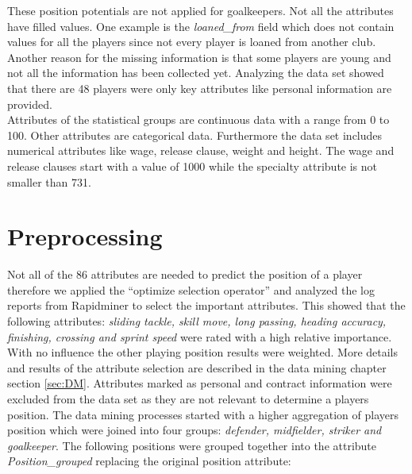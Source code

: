 \documentclass[runningheads]{llncs}
\begin{document}
These position potentials are not applied for goalkeepers. 
Not all the attributes have filled values. One example is the \textit{loaned\_from} field which does not contain values for all the players since not every player is loaned from another club. Another reason for the missing information is that some players are young and not all the information has been collected yet. 
Analyzing the data set showed that there are 48 players were only key attributes like personal information are provided. \\
Attributes of the statistical groups are continuous data with a range from 0 to 100. Other attributes are categorical data. Furthermore the data set includes numerical attributes like wage, release clause, weight and height.
The wage and release clauses start with a value of 1000 while the specialty attribute is not smaller than 731.

\section{Preprocessing}
\label{sec:preprocessing}
Not all of the 86 attributes are needed to predict the position of a player therefore we applied the ``optimize selection operator'' and analyzed the log reports from Rapidminer to select the important attributes.
This showed that the following attributes:\textit{ sliding tackle, skill move, long passing, heading accuracy, finishing, crossing and sprint speed} were rated with a high relative importance. With no influence the other playing position results were weighted. More details and results of the attribute selection are described in the data mining chapter section \ref{sec:DM}.
Attributes marked as personal and contract information were excluded from the data set as they are not relevant to determine a players position. 
The data mining processes started with a higher aggregation of players position which were joined into four groups: \textit{defender, midfielder, striker and goalkeeper}. The following positions were grouped together into the attribute  \textit{Position\_grouped} replacing the original position attribute:
\end{document}
